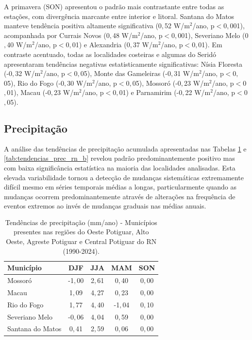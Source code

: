 A primavera (SON) apresentou o padrão mais contrastante entre todas as estações, com divergência marcante entre interior e litoral. Santana do Matos manteve tendência positiva altamente significativa (0${,}$52 W/m$^2$/ano, p$<$0${,}$001), acompanhada por Currais Novos (0${,}$48 W/m$^2$/ano, p$<$0${,}$001), Severiano Melo (0${,}$40 W/m$^2$/ano, p$<$0${,}$01) e Alexandria (0${,}$37 W/m$^2$/ano, p$<$0${,}$01). Em contraste acentuado, todas as localidades costeiras e algumas do Seridó apresentaram tendências negativas estatisticamente significativas: Nísia Floresta (-0${,}$32 W/m$^2$/ano, p$<$0${,}$05), Monte das Gameleiras (-0${,}$31 W/m$^2$/ano, p$<$0${,}$05), Rio do Fogo (-0${,}$30 W/m$^2$/ano, p$<$0${,}$05), Mossoró (-0${,}$23 W/m$^2$/ano, p$<$0${,}$01), Macau (-0${,}$23 W/m$^2$/ano, p$<$0${,}$01) e Parnamirim (-0${,}$22 W/m$^2$/ano, p$<$0${,}$05).

\subsection{Precipitação}

A análise das tendências de precipitação acumulada apresentadas nas Tabelas \ref{tab:tendencias_prec_rn_a} e \ref{tab:tendencias_prec_rn_b} revelou padrão predominantemente positivo mas com baixa significância estatística na maioria das localidades analisadas. Esta elevada variabilidade tornou a detecção de mudanças sistemáticas extremamente difícil mesmo em séries temporais médias a longas, particularmente quando as mudanças ocorrem predominantemente através de alterações na frequência de eventos extremos ao invés de mudanças graduais nas médias anuais.

\begin{table}[H]
	\centering
	\caption{Tendências de precipitação (mm/ano) - Municípios presentes nas regiões do Oeste Potiguar, Alto Oeste, Agreste Potiguar e Central Potiguar do RN (1990-2024).}
	\label{tab:tendencias_prec_rn_a}
	\small
	\begin{tabular}{lcccc}
		\hline
		\textbf{Município} & \textbf{DJF} & \textbf{JJA} & \textbf{MAM} & \textbf{SON} \\
		\hline
		Mossoró  & -1${,}$00& 2${,}$61 & 0${,}$40 & 0${,}$00 \\
		Macau& 1${,}$09 & 4${,}$27 & 0${,}$23 & 0${,}$00 \\
		Rio do Fogo & 1${,}$77 & 4${,}$40 & -1${,}$04& 0${,}$10 \\
		Severiano Melo & -0${,}$06& 4${,}$04 & 0${,}$59 & 0${,}$00 \\
		Santana do Matos & 0${,}$41 & 2${,}$59 & 0${,}$06 & 0${,}$00 \\
		\hline
	\end{tabular}
\end{table}

